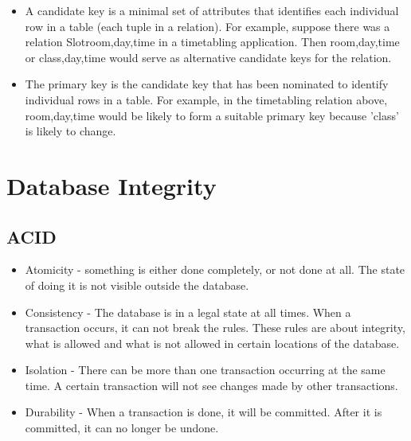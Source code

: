 \documentclass[10pt]{article}
\begin{document}
\begin{itemize}
      \item A candidate key is a minimal set of attributes that identifies each individual
      row in a table (each tuple in a relation). For example, suppose there was a
      relation Slotroom,day,time in a timetabling application. Then room,day,time or
      class,day,time would serve as alternative candidate keys for the relation.

      \item The primary key is the candidate key that has been nominated to identify individual
      rows in a table. For example, in the timetabling relation above, room,day,time
      would be likely to form a suitable primary key because ’class’ is likely to change.
    \end{itemize}


  \section*{Database Integrity}
    \subsection*{ACID}
      \begin{itemize}
        \item Atomicity - something is either done completely, or not done at all. The state of doing it is not visible outside the database.
        \item Consistency - The database is in a legal state at all times. When a transaction occurs, it can not break the rules. These rules are about integrity, what is allowed and what is not allowed in certain locations of the database.
        \item Isolation - There can be more than one transaction occurring at the same time. A certain transaction will not see changes made by other transactions.
        \item Durability - When a transaction is done, it will be committed. After it is committed, it can no longer be undone.
      \end{itemize}
\end{document}

